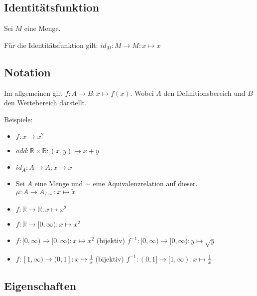 \documentclass[12pt]{scrreprt}
\begin{document}
            \subsection{Identitätsfunktion}
                \label{ss:grundbegriffe_funktionen_identitaet}

                Sei $ M $ eine Menge.

                Für die Identitätsfunktion gilt: $ id _ M : M \rightarrow M : x \mapsto x $


            \subsection{Notation}
                \label{ss:grundbegriffe_funktionen_notation}

                Im allgemeinen gilt $ f : A \rightarrow B : x \mapsto f(x) $. Wobei $ A $ den Definitionsbereich und $ B $ den Wertebereich darstellt.

                Beispiele:
                \begin{itemize}
                    \item $ f : x \rightarrow x ^ 2 $
                    \item $ add : \mathbb{R} \times \mathbb{R} : (x, y) \mapsto x + y $
                    \item $ id _ A : A \rightarrow A : x \mapsto x $
                    \item Sei $ A $ eine Menge und $ \sim $ eine Äquivalenzrelation auf dieser. $ \mu : A \rightarrow A _ { /\sim } : x \mapsto \tilde{x} $
                    \item $ f : \mathbb{R} \rightarrow \mathbb{R} : x \mapsto x ^ 2 $
                    \item $ f : \mathbb{R} \rightarrow [0, \infty) : x \mapsto x ^ 2 $
                    \item $ f : [0, \infty) \rightarrow [0, \infty) : x \mapsto x ^ 2 $ (bijektiv) $ f ^ { -1 } : [0, \infty) \rightarrow [0, \infty) : y \mapsto \sqrt{y} $
                    \item $ f : [1, \infty) \rightarrow (0, 1] : x \mapsto \frac{1}{x} $ (bijektiv) $ f ^ { -1 } : (0, 1] \rightarrow [1, \infty) : x \mapsto \frac{1}{x} $
                \end{itemize}


            \subsection{Eigenschaften}
                \label{ss:grundbegriffe_funktionen_eigenschaften}
\end{document}
